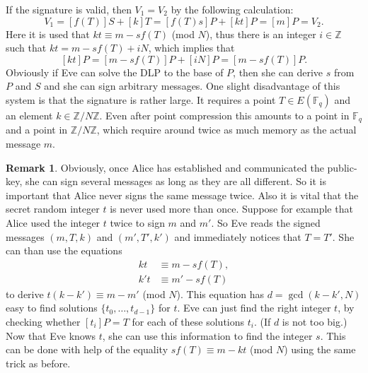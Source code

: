 \documentclass{article}
\numberwithin{equation}{section}
\theoremstyle{definition}
\newtheorem{remark}[theorem]{Remark}
\newcommand{\ZZ}{{\mathbb Z}} %
\newcommand{\Zmod}[1]{\ZZ / #1\ZZ} %
\newcommand{\FF}[1]{{\mathbb F}_{#1}} %
\begin{document}
If the signature is valid, then $V_1=V_2$ by the following calculation:
$$V_1=[f(T)]S+[k]T=[f(T)s]P +[kt]P=[m]P=V_2.$$ Here it is used that $kt \equiv m-sf(T)$ (mod $N$), thus there is an integer $i\in \ZZ$ such that $kt=m-sf(T)+iN$, which implies that $$[kt]P=[m-sf(T)]P+[iN]P = [m-sf(T)]P.$$ 
Obviously if Eve can solve the DLP to the base of $P$, then she can derive $s$ from $P$ and $S$ and she can sign arbitrary messages. One slight disadvantage of this system is that the signature is rather large. It requires a point $T \in E(\FF{q})$ and an element $k \in \Zmod{N}$. Even after point compression this amounts to a point in $\FF{q}$ and a point in $\Zmod{N}$, which require around twice as much memory as the actual message $m$. 

\begin{remark}
Obviously, once Alice has established and communicated the public-key, she can sign several messages as long as they are all different. So it is important that Alice never signs the same message twice. Also it is vital that the secret random integer $t$ is never used more than once. Suppose for example that Alice used the integer $t$ twice to sign $m$ and $m'$. So Eve reads the signed messages $(m,T,k)$ and $(m',T',k')$ and immediately notices that $T=T'$. She can than use the equations 
\begin{align*}
kt &\equiv m-sf(T),\\
k't &\equiv m'-sf(T)
\end{align*}
to derive $t(k-k') \equiv m-m'$ (mod $N$). This equation has $d=\gcd (k-k',N)$ easy to find solutions $\{t_0,
\ldots,t_{d-1}\}$ for $t$. Eve can just find the right integer $t$, by checking whether $[t_i]P=T$ for each of these solutions $t_i$. (If $d$ is not too big.) Now that Eve knows $t$, she can use this information to find the integer $s$. This can be done with help of the equality $sf(T)\equiv m-kt$  (mod $N$) using the same trick as before. 
\end{remark}\newpage
\end{document}
